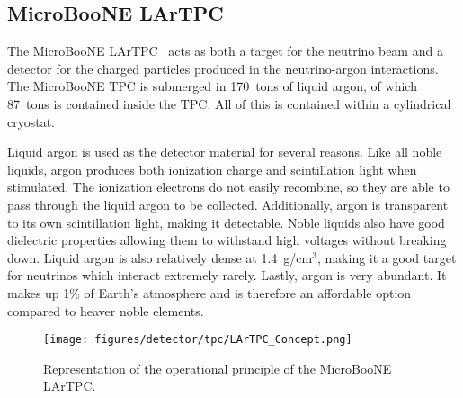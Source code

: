 \subsection{MicroBooNE LArTPC}\label{sec:lartpc}
  The MicroBooNE LArTPC~\cite{detector} acts as both a target for the neutrino
  beam and a detector for the charged particles produced in the neutrino-argon
  interactions. The MicroBooNE TPC is submerged in 170~tons of liquid argon, of
  which 87~tons is contained inside the TPC. All of this is contained within a
  cylindrical cryostat.
  
  Liquid argon is used as the detector material for several reasons. Like all
  noble liquids, argon produces both ionization charge and scintillation light
  when stimulated.  The ionization electrons do not easily recombine, so they
  are able to pass through the liquid argon to be collected.  Additionally,
  argon is transparent to its own scintillation light, making it detectable.
  Noble liquids also have good dielectric properties allowing them to withstand
  high voltages without breaking down. Liquid argon is also relatively dense at
  1.4~g/cm$^3$, making it a good target for neutrinos which interact extremely
  rarely. Lastly, argon is very abundant.  It makes up 1\% of Earth's
  atmosphere and is therefore an affordable option compared to heaver noble
  elements.

  \begin{figure}[h]
    \centering
    \texttt{[image: figures/detector/tpc/LArTPC\_Concept.png]}
    \caption{Representation of the operational principle of the MicroBooNE
    LArTPC.}
    \label{fig:tpccartoon}
  \end{figure}

